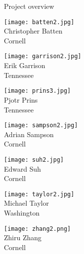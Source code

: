 \documentclass{cbxposter}
\renewcommand{\smallskip}{\vspace{0.16667in}}
\begin{document}
\begin{frame}[fragile,t]{}
\begin{columns}[T]
\begin{column}{10.5in}
\begin{block}{Project overview}
  \begin{center}
  \begin{minipage}[t]{0.135\tw}
    \vspace{0pt}\centering
    \smallskip
    \texttt{[image: batten2.jpg]}\\
    \smallskip
    Christopher Batten\\[0.005in]
    Cornell
  \end{minipage}
  \begin{minipage}[t]{0.135\tw}
    \vspace{0pt}\centering
    \smallskip
    \texttt{[image: garrison2.jpg]}\\
    \smallskip
    Erik Garrison\\
    Tennessee
  \end{minipage}
  \begin{minipage}[t]{0.135\tw}
    \vspace{0pt}\centering
    \smallskip
    \texttt{[image: prins3.jpg]}\\
    \smallskip
    Pjotr Prins\\
    Tennessee
  \end{minipage}
  \begin{minipage}[t]{0.135\tw}
    \vspace{0pt}\centering
    \smallskip
    \texttt{[image: sampson2.jpg]}\\
    \smallskip
    Adrian Sampson\\
    Cornell
  \end{minipage}
  \begin{minipage}[t]{0.135\tw}
    \vspace{0pt}\centering
    \smallskip
    \texttt{[image: suh2.jpg]}\\
    \smallskip
    Edward Suh\\
    Cornell
  \end{minipage}
  \begin{minipage}[t]{0.135\tw}
    \vspace{0pt}\centering
    \smallskip
    \texttt{[image: taylor2.jpg]}\\
    \smallskip
    Michael Taylor\\
    Washington
  \end{minipage}
  \begin{minipage}[t]{0.135\tw}
    \vspace{0pt}\centering
    \smallskip
    \texttt{[image: zhang2.png]}\\
    \smallskip
    Zhiru Zhang\\
    Cornell
  \end{minipage}
\end{center}
\end{block}


\end{column}
\end{columns}
\end{frame}
\end{document}
